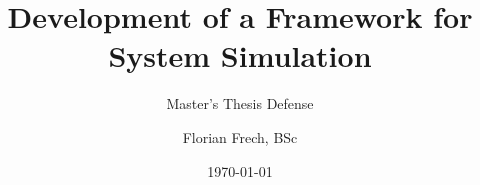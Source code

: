 \title[Development of a Framework for System Simulation]{Development of a Framework for System Simulation}
\subtitle{Master's Thesis Defense}
\author[F. Frech]{Florian Frech, BSc}
\date{\today}

